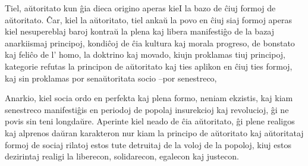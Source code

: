 Tiel, aŭtoritato kun ĝia dieca origino aperas kieI la bazo de ĉiuj formoj de aŭtoritato. Ĉar, kiel la aŭtoritato, tiel ankaŭ la povo en ĉiuj siaj formoj aperas kiel nesupereblaj baroj kontraŭ la plena kaj libera manifestiĝo de la bazaj anarkiismaj principoj, kondiĉoj de ĉia kultura kaj morala progreso, de bonstato kaj feliĉo de l’ homo, la doktrino kaj movado, kiujn proklamas tiuj principoj, kategorie refutas la principon de aŭtoritato kaj ties aplikon en ĉiuj ties formoj, kaj sin proklamas por senaŭtoritata socio –por senestreco,

Anarkio, kiel socia ordo en perfekta kaj plena formo, neniam ekzistis, kaj kiam senestreco manifestiĝis en periodoj de popolaj insurekcioj kaj revolucioj, ĝi ne povis sin teni longdaŭre. Aperinte kiel neado de ĉia aŭtoritato, ĝi plene realigos kaj alprenos daŭran karakteron nur kiam la principo de aŭtoritato kaj aŭtoritataj formoj de sociaj rilatoj estos tute detruitaj de la voloj de la popoloj, kiuj estos dezirintaj realigi la liberecon, solidarecon, egalecon kaj justecon. 